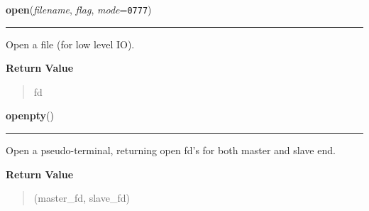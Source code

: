 \hspace{.8\funcindent}\begin{boxedminipage}{\funcwidth}

    \raggedright \textbf{open}(\textit{filename}, \textit{flag}, \textit{mode}={\tt 0777})

    \vspace{-1.5ex}

    \rule{\textwidth}{0.5\fboxrule}
\setlength{\parskip}{2ex}
    Open a file (for low level IO).

\setlength{\parskip}{1ex}
      \textbf{Return Value}
    \vspace{-1ex}

      \begin{quote}
      fd

      \end{quote}

    \end{boxedminipage}

    \label{os:openpty}

    \vspace{0.5ex}

\hspace{.8\funcindent}\begin{boxedminipage}{\funcwidth}

    \raggedright \textbf{openpty}()

    \vspace{-1.5ex}

    \rule{\textwidth}{0.5\fboxrule}
\setlength{\parskip}{2ex}
    Open a pseudo-terminal, returning open fd's for both master and slave 
    end.

\setlength{\parskip}{1ex}
      \textbf{Return Value}
    \vspace{-1ex}

      \begin{quote}
      (master\_fd, slave\_fd)

      \end{quote}

    \end{boxedminipage}

    \label{os:pathconf}

    \vspace{0.5ex}


